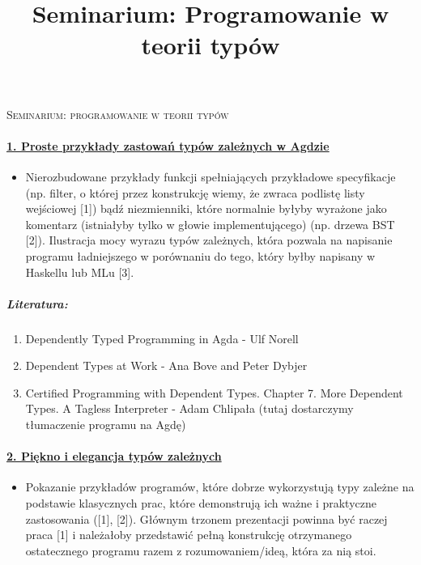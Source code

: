 \documentclass[10pt, a4paper]{article}
\author{}
\title{Seminarium: Programowanie w teorii typów}
\begin{document}
\begin{center}
\begin{Large}
\textsc{Seminarium: programowanie w teorii typów}
\end{Large}
\end{center}

\paragraph{\underline{1. Proste przykłady zastowań typów zależnych w Agdzie}}

\begin{itemize}
 \item Nierozbudowane przykłady funkcji spełniających przykładowe specyfikacje 
     (np. filter, o której przez konstrukcję wiemy, że zwraca podlistę listy wejściowej [1]) 
     bądź niezmienniki, które normalnie byłyby wyrażone jako komentarz (istniałyby tylko w głowie implementującego) 
     (np. drzewa BST [2]). Ilustracja mocy wyrazu typów zależnych, 
  która pozwala na napisanie programu ładniejszego w porównaniu do tego, który byłby napisany w Haskellu lub MLu [3].
\end{itemize}

\subparagraph{Literatura:}

\begin{enumerate}
\addtolength{\itemsep}{-0.5\baselineskip}
 \item  Dependently Typed Programming in Agda - Ulf Norell
 \item  Dependent Types at Work - Ana Bove and Peter Dybjer
 \item  Certified Programming with Dependent Types. Chapter 7. More Dependent Types. A Tagless Interpreter - Adam Chlipała (tutaj dostarczymy tłumaczenie programu na Agdę)
\end{enumerate}

\paragraph{\underline{2. Piękno i elegancja typów zależnych}}

\begin{itemize}
 \item 
Pokazanie przykładów programów, które dobrze wykorzystują typy zależne na podstawie 
klasycznych prac, które demonstrują ich ważne i praktyczne zastosowania ([1], [2]). Głównym 
trzonem prezentacji powinna być raczej praca [1] i należałoby przedstawić pełną konstrukcję otrzymanego 
ostatecznego programu razem z rozumowaniem/ideą, która za nią stoi.
\end{itemize}
\end{document}
